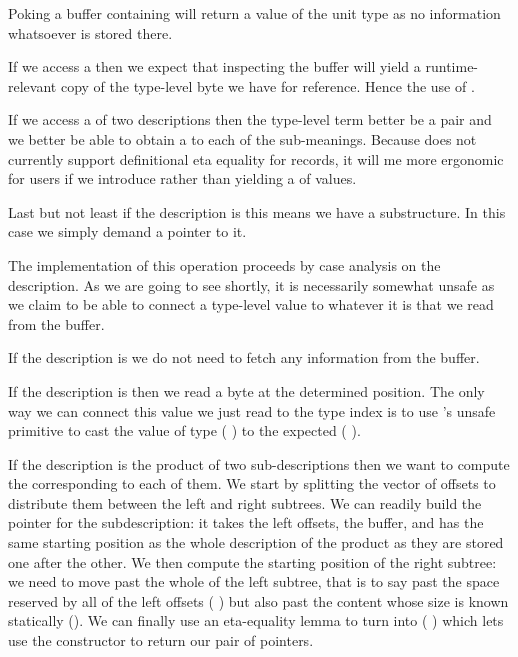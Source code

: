 
Poking a buffer containing  will return a value of
the unit type as no information whatsoever is stored there.

If we access a  then we expect that inspecting the
buffer will yield a runtime-relevant copy of the type-level byte we
have for reference. Hence the use of .

If we access a  of two descriptions then the type-level term
better be a pair and we better be able to obtain a 
to each of the sub-meanings.
%
Because \idris{} does not currently support definitional eta equality
for records, it will me more ergonomic for users if we introduce
 rather than yielding a  of values.

Last but not least if the description is  this means
we have a substructure. In this case we simply demand a pointer to it.


The implementation of this operation proceeds by case analysis
on the description.
%
As we are going to see shortly, it is necessarily somewhat unsafe
as we claim to be able to connect a type-level value to whatever
it is that we read from the buffer.


If the description is  we do not need to fetch any
information from the buffer.


If the description is  then we read a byte at the
determined position. The only way we can connect this value we just
read to the type index is to use \idris{}'s unsafe primitive
\believeMe{} to cast the value of type
( )
to the expected
( ).


If the description is the product of two sub-descriptions then we
want to compute the  corresponding to
each of them.
%
We start by splitting the vector of offsets to distribute them between
the left and right subtrees.
%
We can readily build the pointer for the  subdescription:
it takes the left offsets, the buffer, and has the same starting position
as the whole description of the product as they are stored one after the other.
%
We then compute the starting position of the right subtree: we need to
move past the whole of the left subtree, that is to say past the space
reserved by all of the left offsets ( )
but also past the content whose size is known statically ().
%
We can finally use an eta-equality lemma to turn  into
(  \IdrisData{\#}  )
which lets use the  constructor \IdrisData{(\#)} to return our
pair of pointers.

